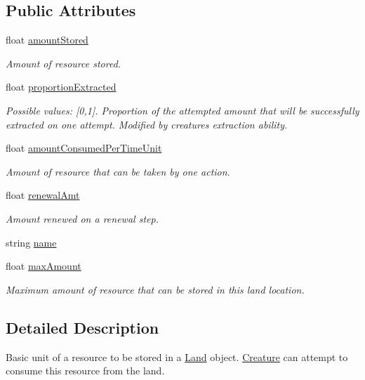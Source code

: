 \subsection*{Public Attributes}
\begin{DoxyCompactItemize}
\item 
float \mbox{\hyperlink{class_resource_store_a8fbddc12eb1ca75affdc31a4a5244917}{amount\+Stored}}
\begin{DoxyCompactList}\small\item\em Amount of resource stored. \end{DoxyCompactList}\item 
float \mbox{\hyperlink{class_resource_store_a17216b811a57c86dc3dfd0310f647bdb}{proportion\+Extracted}}
\begin{DoxyCompactList}\small\item\em Possible values\+: \mbox{[}0,1\mbox{]}. Proportion of the attempted amount that will be successfully extracted on one attempt. Modified by creature\textquotesingle{}s extraction ability. \end{DoxyCompactList}\item 
float \mbox{\hyperlink{class_resource_store_aadc1eae620b2c81bd4d16de13ca7f435}{amount\+Consumed\+Per\+Time\+Unit}}
\begin{DoxyCompactList}\small\item\em Amount of resource that can be taken by one action. \end{DoxyCompactList}\item 
float \mbox{\hyperlink{class_resource_store_a0f9723ce7385fb03909eeea64c38fdbb}{renewal\+Amt}}
\begin{DoxyCompactList}\small\item\em Amount renewed on a renewal step. \end{DoxyCompactList}\item 
string \mbox{\hyperlink{class_resource_store_a688e70d481b87077fd1af3c11743f9f8}{name}}
\item 
float \mbox{\hyperlink{class_resource_store_ae86f3cd5ac8a8bc58ee1db0917ef3021}{max\+Amount}}
\begin{DoxyCompactList}\small\item\em Maximum amount of resource that can be stored in this land location. \end{DoxyCompactList}\end{DoxyCompactItemize}


\subsection{Detailed Description}
Basic unit of a resource to be stored in a \mbox{\hyperlink{class_land}{Land}} object. \mbox{\hyperlink{class_creature}{Creature}} can attempt to consume this resource from the land. 



